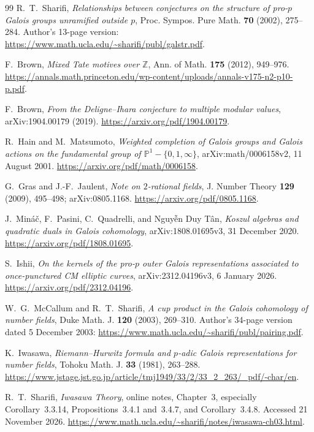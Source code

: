 \documentclass[11pt,a4paper]{article}
\theoremstyle{definition}
\begin{document}
\begin{thebibliography}{99}
R.~T.~Sharifi, \emph{Relationships between conjectures on the structure
of pro-$p$ Galois groups unramified outside $p$},
Proc. Sympos. Pure Math. \textbf{70} (2002), 275--284.
Author's 13-page version: \url{https://www.math.ucla.edu/~sharifi/publ/galstr.pdf}.


F.~Brown, \emph{Mixed Tate motives over $\mathbb Z$},
Ann. of Math. \textbf{175} (2012), 949--976.
\url{https://annals.math.princeton.edu/wp-content/uploads/annals-v175-n2-p10-p.pdf}.


F.~Brown, \emph{From the Deligne--Ihara conjecture to multiple modular values},
arXiv:1904.00179 (2019).
\url{https://arxiv.org/pdf/1904.00179}.


R.~Hain and M.~Matsumoto, \emph{Weighted completion of Galois groups
and Galois actions on the fundamental group of $\mathbb P^1-\{0,1,\infty\}$},
arXiv:math/0006158v2, 11 August 2001.
\url{https://arxiv.org/pdf/math/0006158}.


G.~Gras and J.-F.~Jaulent, \emph{Note on $2$-rational fields},
J. Number Theory \textbf{129} (2009), 495--498;
arXiv:0805.1168.
\url{https://arxiv.org/pdf/0805.1168}.


J.~Min\'a\v c, F.~Pasini, C.~Quadrelli, and Nguy{\~{\^e}}n Duy T\^an,
\emph{Koszul algebras and quadratic duals in Galois cohomology},
arXiv:1808.01695v3, 31 December 2020.
\url{https://arxiv.org/pdf/1808.01695}.


S.~Ishii, \emph{On the kernels of the pro-$p$ outer Galois representations
associated to once-punctured CM elliptic curves},
arXiv:2312.04196v3, 6 January 2026.
\url{https://arxiv.org/pdf/2312.04196}.


W.~G.~McCallum and R.~T.~Sharifi,
\emph{A cup product in the Galois cohomology of number fields},
Duke Math. J. \textbf{120} (2003), 269--310.
Author's 34-page version dated 5 December 2003:
\url{https://www.math.ucla.edu/~sharifi/publ/pairing.pdf}.


K.~Iwasawa, \emph{Riemann--Hurwitz formula and $p$-adic Galois
representations for number fields},
Tohoku Math. J. \textbf{33} (1981), 263--288.
\url{https://www.jstage.jst.go.jp/article/tmj1949/33/2/33_2_263/_pdf/-char/en}.


R.~T.~Sharifi, \emph{Iwasawa Theory}, online notes, Chapter~3,
especially Corollary~3.3.14, Propositions~3.4.1 and~3.4.7,
and Corollary~3.4.8. Accessed 21 November 2026.
\url{https://www.math.ucla.edu/~sharifi/notes/iwasawa-ch03.html}.



\end{thebibliography}
\end{document}

